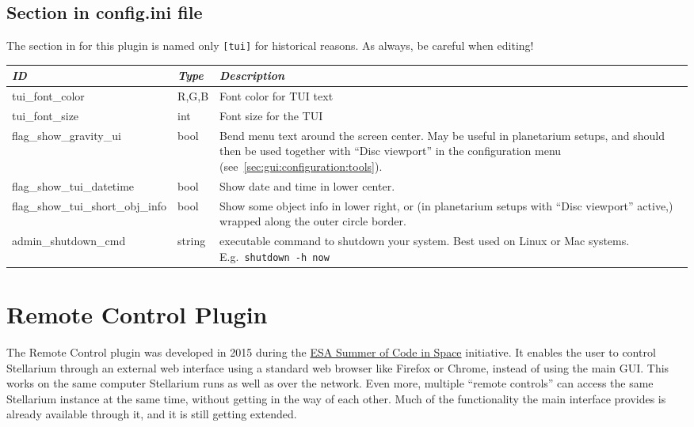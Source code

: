 \subsection{Section  in config.ini file}
\label{sec:plugins:TUI:config}

The section in  for this plugin is named only \texttt{[tui]} for historical reasons. As always, be careful when editing!

\begin{longtabu} to \textwidth {l|l|X}\toprule
\emph{ID}            & \emph{Type} & \emph{Description}\\\midrule
tui\_font\_color     & R,G,B & Font color for TUI text \\\midrule
tui\_font\_size      & int   & Font size for the TUI \\\midrule
flag\_show\_gravity\_ui           &bool&Bend menu text around the screen center. 
                                        May be useful in planetarium setups, and should then be used together with ``Disc viewport'' 
                                        in the configuration menu (see~\ref{sec:gui:configuration:tools}). \\\midrule
flag\_show\_tui\_datetime         &bool&Show date and time in lower center.\\\midrule
flag\_show\_tui\_short\_obj\_info &bool&Show some object info in lower right, or (in planetarium setups with ``Disc viewport'' active,) wrapped along the outer circle border. \\\midrule
admin\_shutdown\_cmd              &string& executable command to shutdown your system. Best used on Linux or Mac systems. E.g.\ \texttt{shutdown -h now}\\\bottomrule
\end{longtabu}



\newpage
\section{Remote Control Plugin}
\label{sec:plugin:RemoteControl}

The Remote Control plugin was developed in 2015 during the 
\href{http://sophia.estec.esa.int/socis/}{ESA Summer of Code in Space} 
initiative. It enables the user to control Stellarium through an external web 
interface using a standard web browser like Firefox or Chrome, instead of using 
the main GUI. This works on the same computer Stellarium runs as well as over 
the network. Even more, multiple ``remote controls'' can access the same 
Stellarium instance at the same time, without getting in the way of each other. 
Much of the functionality the main interface provides is already available 
through it, and it is still getting extended.

